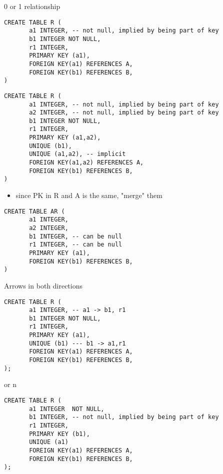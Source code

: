 \documentclass[presentation]{beamer}
\begin{document}
\begin{frame}[fragile,label={sec:org48265ac}]{0 or 1 relationship}
 \small

\begin{verbatim}
CREATE TABLE R (
       a1 INTEGER, -- not null, implied by being part of key
       b1 INTEGER NOT NULL,
       r1 INTEGER, 
       PRIMARY KEY (a1),
       FOREIGN KEY(a1) REFERENCES A,
       FOREIGN KEY(b1) REFERENCES B,
)

\end{verbatim}

\begin{verbatim}
CREATE TABLE R (
       a1 INTEGER, -- not null, implied by being part of key
       a2 INTEGER, -- not null, implied by being part of key
       b1 INTEGER NOT NULL,
       r1 INTEGER, 
       PRIMARY KEY (a1,a2),
       UNIQUE (b1),
       UNIQUE (a1,a2), -- implicit
       FOREIGN KEY(a1,a2) REFERENCES A,
       FOREIGN KEY(b1) REFERENCES B,
)

\end{verbatim}



\begin{itemize}
\item since PK in R and A is the same, "merge" them
\end{itemize}

\begin{verbatim}
CREATE TABLE AR (
       a1 INTEGER,
       a2 INTEGER,
       b1 INTEGER, -- can be null
       r1 INTEGER, -- can be null
       PRIMARY KEY (a1),
       FOREIGN KEY(b1) REFERENCES B,
)

\end{verbatim}
\end{frame}

\begin{frame}[fragile,label={sec:org2d5d2cd}]{Arrows in both directions}
 \small

\begin{verbatim}
CREATE TABLE R (
       a1 INTEGER, -- a1 -> b1, r1
       b1 INTEGER NOT NULL,
       r1 INTEGER, 
       PRIMARY KEY (a1),
       UNIQUE (b1) --- b1 -> a1,r1
       FOREIGN KEY(a1) REFERENCES A,
       FOREIGN KEY(b1) REFERENCES B,
);
\end{verbatim}

or n

\begin{verbatim}
CREATE TABLE R (
       a1 INTEGER  NOT NULL,
       b1 INTEGER, -- not null, implied by being part of key
       r1 INTEGER, 
       PRIMARY KEY (b1),
       UNIQUE (a1)
       FOREIGN KEY(a1) REFERENCES A,
       FOREIGN KEY(b1) REFERENCES B,
);
\end{verbatim}
\end{frame}
\end{document}
